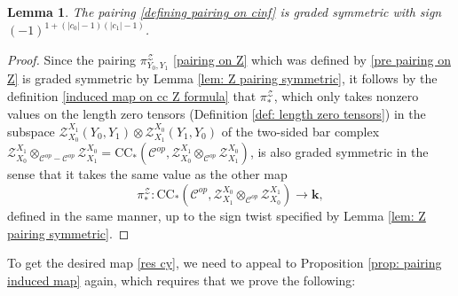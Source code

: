 \documentclass[11pt]{amsproc}
\def\K{{\mathbf{k}}}
\def\cZ{\mathcal{Z}}
\def\cc{\mathcal{C}}
\def\r#1{\mathrm{#1}}
\newtheorem{lem}{Lemma}[section]
\theoremstyle{remark}
\numberwithin{equation}{section}
\begin{document}
\begin{lem}\label{lem: pairing commutative}
The pairing \eqref{defining pairing on cinf} is graded symmetric with sign $(-1)^{1+(|c_{0}|-1)(|c_{1}|-1)}$.
\end{lem}
\begin{proof}
Since the pairing $\pi^{\cZ}_{Y_{0}, Y_{1}}$ \eqref{pairing on Z} which was defined by \eqref{pre pairing on Z} is graded symmetric by Lemma \ref{lem: Z pairing symmetric},
it follows by the definition \eqref{induced map on cc Z formula} that $\pi^{\cZ}_{*}$,
which only takes nonzero values on the length zero tensors (Definition \ref{def: length zero tensors}) in the subspace $\cZ_{X_{0}}^{X_{1}}(Y_{0}, Y_{1}) \otimes \cZ_{X_{1}}^{X_{0}}(Y_{1}, Y_{0})$ of the two-sided bar complex $\cZ_{X_{0}}^{X_{1}} \otimes_{\cc^{op}-\cc^{op}} \cZ_{X_{1}}^{X_{0}} = \r{CC}_{*}(\cc^{op}, \cZ_{X_{0}}^{X_{1}} \otimes_{\cc^{op}} \cZ_{X_{1}}^{X_{0}})$,
is also graded symmetric in the sense that it takes the same value as the other map
\begin{equation}
\pi^{\cZ}_{*}: \r{CC}_{*}(\cc^{op}, \cZ_{X_{1}}^{X_{0}} \otimes_{\cc^{op}} \cZ_{X_{0}}^{X_{1}}) \to \K,
\end{equation}
defined in the same manner, up to the sign twist specified by Lemma \ref{lem: Z pairing symmetric}. 
\end{proof}

To get the desired map \eqref{res cy}, we need to appeal to Proposition \ref{prop: pairing induced map} again,
which requires that we prove the following:
\end{document}
